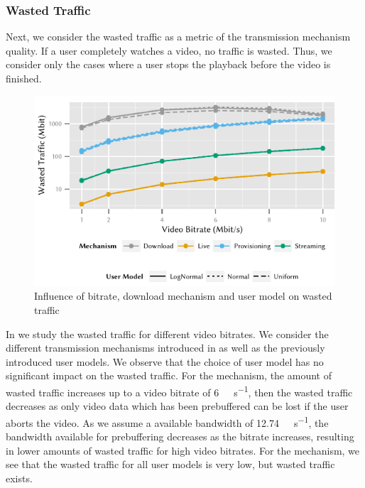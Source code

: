 \subsubsection*{Wasted Traffic}\label{sec:application:lte_video:numerical_evaluation:wasted_traffic}
Next, we consider the wasted traffic as a metric of the transmission mechanism quality.
If a user completely watches a video, no traffic is wasted.
Thus, we consider only the cases where a user stops the playback before the video is finished.
\begin{figure}
  \centering
  \includegraphics{application/lte_video/numerical_evaluation/figures/bitrate2lostData}
  \caption{Influence of bitrate, download mechanism and user model on wasted traffic}
  \label{fig:application:lte_video:numerical_evaluation:energy_consumption:bitrate2lostData}
\end{figure}
In  we study the wasted traffic for different video bitrates.
We consider the different transmission mechanisms introduced in  as well as the previously introduced user models.
We observe that the choice of user model has no significant impact on the wasted traffic.
For the \download mechanism, the amount of wasted traffic increases up to a video bitrate of \SI{6}{\mega\bit\per\second}, then the wasted traffic decreases as only video data which has been prebuffered can be lost if the user aborts the video.
As we assume a available bandwidth of \SI{12.74}{\mega\bit\per\second}, the bandwidth available for prebuffering decreases as the bitrate increases, resulting in lower amounts of wasted traffic for high video bitrates.
For the \live mechanism, we see that the wasted traffic for all user models is very low, but wasted traffic exists.
